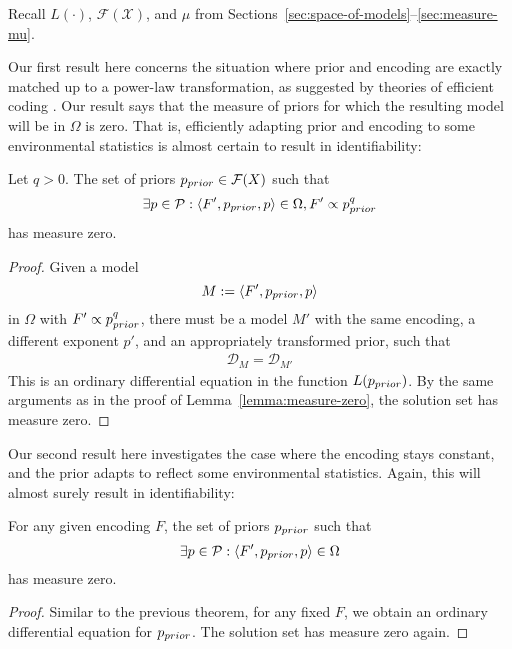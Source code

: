 Recall $L(\cdot)$, $\mathcal{F}(\mathcal{X})$, and $\mu$ from Sections~\ref{sec:space-of-models}--\ref{sec:measure-mu}.

Our first result here concerns the situation where prior and encoding are exactly matched up to a power-law transformation, as suggested by theories of efficient coding \citep[e.g.][]{Wei2015ABO, Morais2018PowerlawEN}. Our result says that the measure of priors for which the resulting model will be in $\Omega$ is zero. That is, efficiently adapting prior and encoding to some environmental statistics is almost certain to result in identifiability:
\begin{thm}\label{theorem:full-adaptation}
Let $q > 0$.
    The set of priors $p_{prior} \in \mathcal{F}(X)$ such that
    \begin{equation}
        \exists p \in \mathcal{P}: \langle F', p_{prior}, p\rangle \in \Omega, F' \propto p_{prior}^{q}
    \end{equation}
    has measure zero.
\end{thm}
\begin{proof}
Given a model
\begin{equation}
        M := \langle F', p_{prior}, p\rangle
    \end{equation}
    in $\Omega$ with $F' \propto p_{prior}^{q}$, there must be a model $M'$ with the same encoding, a different exponent $p'$, and an appropriately transformed prior,
    such that
\begin{align*}
    \mathcal{D}_M = \mathcal{D}_{M'}
\end{align*}
This is an ordinary differential equation in the function $L(p_{prior})$.
By the same arguments as in the proof of Lemma~\ref{lemma:measure-zero}, the solution set has measure zero.
\end{proof}
Our second result here investigates the case where the encoding stays constant, and the prior adapts to reflect some environmental statistics. Again, this will almost surely result in identifiability:
\begin{thm}\label{theorem:only-prior-adapts}
    For any given encoding $F$, the set of priors $p_{prior}$ such that
        \begin{equation}
        \exists p \in \mathcal{P}: \langle F', p_{prior}, p\rangle \in \Omega
    \end{equation}
    has measure zero.
\end{thm}
\begin{proof}
    Similar to the previous theorem, for any fixed $F$, we obtain an ordinary differential equation for $p_{prior}$. The solution set has measure zero again.
\end{proof}



